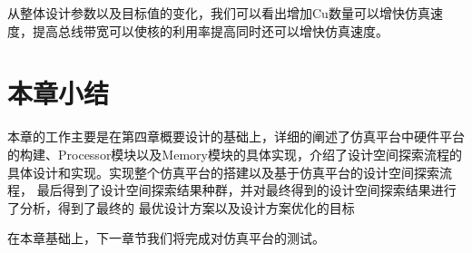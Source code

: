 从整体设计参数以及目标值的变化，我们可以看出增加Cu数量可以增快仿真速度，提高总线带宽可以使核的利用率提高同时还可以增快仿真速度。

\section{本章小结}

本章的工作主要是在第四章概要设计的基础上，详细的阐述了仿真平台中硬件平台
的构建、Processor模块以及Memory模块的具体实现，介绍了设计空间探索流程的
具体设计和实现。实现整个仿真平台的搭建以及基于仿真平台的设计空间探索流程，
最后得到了设计空间探索结果种群，并对最终得到的设计空间探索结果进行了分析，得到了最终的
最优设计方案以及设计方案优化的目标

在本章基础上，下一章节我们将完成对仿真平台的测试。